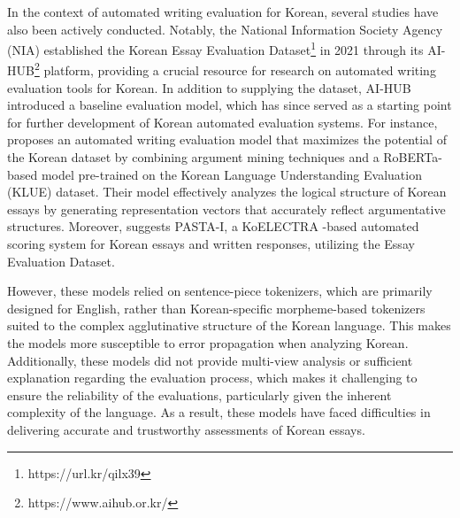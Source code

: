 In the context of automated writing evaluation for Korean, several studies have also been actively conducted. Notably, the National Information Society Agency (NIA) established the Korean \textsf{Essay Evaluation Dataset}\footnote{https://url.kr/qilx39} in 2021 through its \textsf{AI-HUB}\footnote{https://www.aihub.or.kr/} platform, providing a crucial resource for research on automated writing evaluation tools for Korean. In addition to supplying the dataset, AI-HUB introduced a baseline evaluation model, which has since served as a starting point for further development of Korean automated evaluation systems. For instance, \cite{lee2022argument} proposes an automated writing evaluation model that maximizes the potential of the Korean dataset by combining argument mining techniques and a RoBERTa-based model pre-trained on the Korean Language Understanding Evaluation (KLUE) \cite{park2021klue} dataset. Their model effectively analyzes the logical structure of Korean essays by generating representation vectors that accurately reflect argumentative structures. Moreover, \cite{lee2023pasta} suggests \textsf{PASTA-I}, a KoELECTRA \cite{kim2020lmkor}-based automated scoring system for Korean essays and written responses, utilizing the \textsf{Essay Evaluation Dataset}.

However, these models relied on sentence-piece tokenizers, which are primarily designed for English, rather than Korean-specific morpheme-based tokenizers suited to the complex agglutinative structure of the Korean language. This makes the models more susceptible to error propagation when analyzing Korean. Additionally, these models did not provide multi-view analysis or sufficient explanation regarding the evaluation process, which makes it challenging to ensure the reliability of the evaluations, particularly given the inherent complexity of the language. As a result, these models have faced difficulties in delivering accurate and trustworthy assessments of Korean essays.
